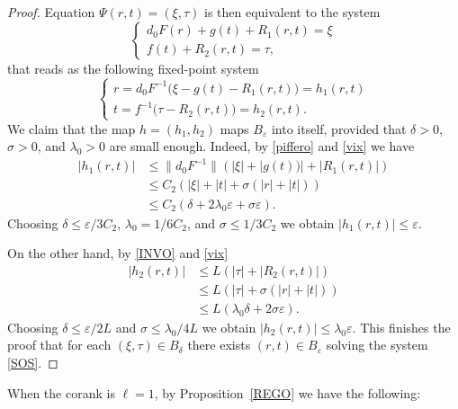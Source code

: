\documentclass[12pt, reqno]{amsart}
\theoremstyle{plain}
\theoremstyle{definition}
\theoremstyle{remark}
\numberwithin{equation}{section}
\newcommand{\0}{\theta}
\newcommand{\1}{{-1}}
\renewcommand{\l}{\ell}
\renewcommand{\=}{\coloneqq}
\renewcommand{\.}{\dots}
\begin{document}
\begin{proof}
 
 
 
 Equation 
 $\Psi(r,t) =(\xi,\tau)$ is then equivalent to the system
 \begin{equation} \label{SOS}
      \left\{
      \begin{array}{ll}
          d_0 F(r) + g(t) +R_1(r,t) = \xi
          \\
          f(t) +  R_2(r,t) =\tau,
      \end{array}
      \right.
 \end{equation}
that reads as the following fixed-point system
 \[
      \left\{
      \begin{array}{ll}
          r = d_0 F^{-1}\big (\xi - g(t)-R_1(r,t) \big)=h_1(r,t)
          \\
          t = f^{-1}  \big( \tau- R_2(r,t)\big)= h_2(r,t).
      \end{array}
      \right.
 \]
 We claim that the map $h = (h_1,h_2)$ maps $B_\varepsilon$ into 
 itself, provided that $\delta>0$, $\sigma>0$,  and $\lambda_0>0$ are small enough.
 Indeed, by \eqref{piffero} and \eqref{vix} we have
 \[
 \begin{split}
 |h_1(r,t)| & \leq \| d_0 F^{-1}\| (|\xi| + |g(t))|+|R_1(r,t)|)
 \\
 &
  \leq  C_2 ( |\xi| +|t| + \sigma   (|r|+|t|))
  \\
  & \leq C_2  (\delta + 2\lambda_0 \varepsilon +\sigma \varepsilon ). 
  \end{split}
 \]
 Choosing $\delta \leq \varepsilon/3 C_2$, $ \lambda_0=1/6 C_2$, and $ \sigma\leq 1/3C_2$ we obtain  $ |h_1(r,t)| \leq \varepsilon$.
 
 
 
 On the other hand, by \eqref{INVO} and \eqref{vix}
 \[
 \begin{split}
   |h_2(r,t)|& \leq L (|\tau|+|R_2(r,t)|)
   \\
   &
    \leq L (|\tau|+ \sigma (|r|+|t|)) 
    \\
    &\leq L ( \lambda_0 \delta + 2\sigma  \varepsilon ).
     \end{split}
 \]
 Choosing $\delta \leq \varepsilon/2L$ and $ \sigma \leq \lambda_0 /4L$ we obtain $   |h_2(r,t)|\leq \lambda_0 \varepsilon$.
 This finishes the proof that for each $(\xi,\tau) \in B_\delta$ there exists $(r,t)\in B_\varepsilon$ solving  the system \eqref{SOS}.
 
   

\end{proof}


When the corank is $\l=1$, by Proposition~\ref{REGO} we have the following:
\end{document}
